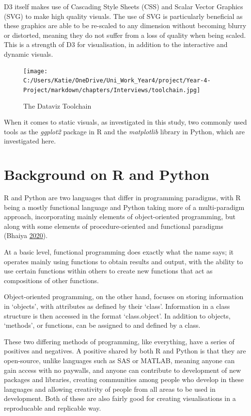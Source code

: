 \documentclass[
  11pt,
]{book}
\begin{document}
D3 itself makes use of Cascading Style Sheets (CSS) and Scalar Vector
Graphics (SVG) to make high quality visuals. The use of SVG is
particularly beneficial as these graphics are able to be re-scaled to
any dimension without becoming blurry or distorted, meaning they do not
suffer from a loss of quality when being scaled. This is a strength of
D3 for visualisation, in addition to the interactive and dynamic
visuals.

\begin{figure}
\centering
\texttt{[image: C:/Users/Katie/OneDrive/Uni\_Work\_Year4/project/Year-4-Project/markdown/chapters/Interviews/toolchain.jpg]}
\caption{The Dataviz Toolchain \label{toolchain}}
\end{figure}

When it comes to static visuals, as investigated in this study, two
commonly used tools as the \textit{ggplot2} package in R and the
\textit{matplotlib} library in Python, which are investigated here.

\section{Background on R and Python}

R and Python are two languages that differ in programming paradigms,
with R being a mostly functional language and Python taking more of a
multi-paradigm approach, incorporating mainly elements of
object-oriented programming, but along with some elements of
procedure-oriented and functional paradigms (Bhaiya
\protect\hyperlink{ref-paradigm}{2020}).

At a basic level, functional programming does exactly what the name
says; it operates mainly using functions to obtain results and output,
with the ability to use certain functions within others to create new
functions that act as compositions of other functions.

Object-oriented programming, on the other hand, focuses on storing
information in `objects', with attributes as defined by their `class'.
Information in a class structure is then accessed in the format
`class.object'. In addition to objects, `methods', or functions, can be
assigned to and defined by a class.

These two differing methods of programming, like everything, have a
series of positives and negatives. A positive shared by both R and
Python is that they are open-source, unlike languages such as SAS or
MATLAB, meaning anyone can gain access with no paywalls, and anyone can
contribute to development of new packages and libraries, creating
communities among people who develop in these languages and allowing
creativity of people from all areas to be used in development. Both of
these are also fairly good for creating visualisations in a reproducable
and replicable way.
\end{document}
